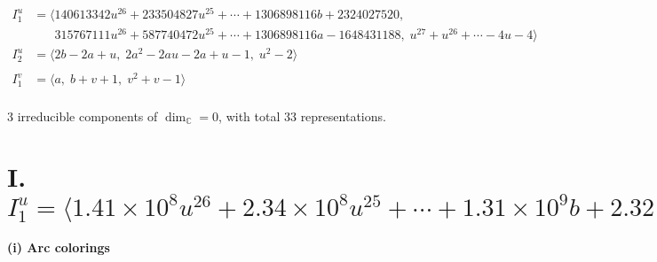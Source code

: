 \documentclass[1p]{elsarticle_modified}
\theoremstyle{definition}
\begin{document}
\begin{align*}
I^u_{1}&=\langle 
140613342 u^{26}+233504827 u^{25}+\cdots+1306898116 b+2324027520,\\
\phantom{I^u_{1}}&\phantom{= \langle  }315767111 u^{26}+587740472 u^{25}+\cdots+1306898116 a-1648431188,\;u^{27}+u^{26}+\cdots-4 u-4\rangle \\
I^u_{2}&=\langle 
2 b-2 a+u,\;2 a^2-2 a u-2 a+u-1,\;u^2-2\rangle \\
\\
I^v_{1}&=\langle 
a,\;b+v+1,\;v^2+v-1\rangle \\
\end{align*}
\raggedright * 3 irreducible components of $\dim_{\mathbb{C}}=0$, with total 33 representations.\\
\newpage
\renewcommand{\arraystretch}{1}
\centering \section*{I. $I^u_{1}= \langle 1.41\times10^{8} u^{26}+2.34\times10^{8} u^{25}+\cdots+1.31\times10^{9} b+2.32\times10^{9},\;3.16\times10^{8} u^{26}+5.88\times10^{8} u^{25}+\cdots+1.31\times10^{9} a-1.65\times10^{9},\;u^{27}+u^{26}+\cdots-4 u-4 \rangle$}
\flushleft \textbf{(i) Arc colorings}\\
\end{document}
